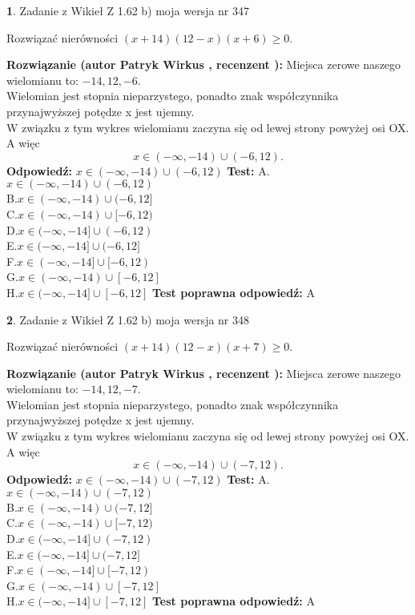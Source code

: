 \documentclass[12pt, a4paper]{article}
\theoremstyle{definition} %
\newtheorem{zad}{}
\newcommand{\zadStart}[1]{\begin{zad}#1\newline}
\newcommand{\zadStop}{\end{zad}}
\newcommand{\rozwStart}[2]{\noindent \textbf{Rozwiązanie (autor #1 , recenzent #2): }\newline}
\newcommand{\rozwStop}{\newline}
\newcommand{\odpStart}{\noindent \textbf{Odpowiedź:}\newline}
\newcommand{\odpStop}{\newline}
\newcommand{\testStart}{\noindent \textbf{Test:}\newline}
\newcommand{\testStop}{\newline}
\newcommand{\kluczStart}{\noindent \textbf{Test poprawna odpowiedź:}\newline}
\newcommand{\kluczStop}{\newline}
\begin{document}
\zadStart{Zadanie z Wikieł Z 1.62 b) moja wersja nr 347}

Rozwiązać nierówności $(x+14)(12-x)(x+6)\ge0$.
\zadStop
\rozwStart{Patryk Wirkus}{}
Miejsca zerowe naszego wielomianu to: $-14, 12, -6$.\\
Wielomian jest stopnia nieparzystego, ponadto znak współczynnika przy\linebreak najwyższej potędze x jest ujemny.\\ W związku z tym wykres wielomianu zaczyna się od lewej strony powyżej osi OX. A więc $$x \in (-\infty,-14) \cup (-6,12).$$
\rozwStop
\odpStart
$x \in (-\infty,-14) \cup (-6,12)$
\odpStop
\testStart
A.$x \in (-\infty,-14) \cup (-6,12)$\\
B.$x \in (-\infty,-14) \cup (-6,12]$\\
C.$x \in (-\infty,-14) \cup [-6,12)$\\
D.$x \in (-\infty,-14] \cup (-6,12)$\\
E.$x \in (-\infty,-14] \cup (-6,12]$\\
F.$x \in (-\infty,-14] \cup [-6,12)$\\
G.$x \in (-\infty,-14) \cup [-6,12]$\\
H.$x \in (-\infty,-14] \cup [-6,12]$
\testStop
\kluczStart
A
\kluczStop



\zadStart{Zadanie z Wikieł Z 1.62 b) moja wersja nr 348}

Rozwiązać nierówności $(x+14)(12-x)(x+7)\ge0$.
\zadStop
\rozwStart{Patryk Wirkus}{}
Miejsca zerowe naszego wielomianu to: $-14, 12, -7$.\\
Wielomian jest stopnia nieparzystego, ponadto znak współczynnika przy\linebreak najwyższej potędze x jest ujemny.\\ W związku z tym wykres wielomianu zaczyna się od lewej strony powyżej osi OX. A więc $$x \in (-\infty,-14) \cup (-7,12).$$
\rozwStop
\odpStart
$x \in (-\infty,-14) \cup (-7,12)$
\odpStop
\testStart
A.$x \in (-\infty,-14) \cup (-7,12)$\\
B.$x \in (-\infty,-14) \cup (-7,12]$\\
C.$x \in (-\infty,-14) \cup [-7,12)$\\
D.$x \in (-\infty,-14] \cup (-7,12)$\\
E.$x \in (-\infty,-14] \cup (-7,12]$\\
F.$x \in (-\infty,-14] \cup [-7,12)$\\
G.$x \in (-\infty,-14) \cup [-7,12]$\\
H.$x \in (-\infty,-14] \cup [-7,12]$
\testStop
\kluczStart
A
\kluczStop
\end{document}
